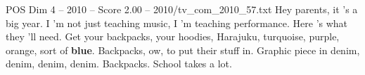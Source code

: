 \begin{textsample}{POS Dim 4 – 2010 – Score 2.00 – 2010/tv\_com\_2010\_57.txt}  \label{ex:f4_pos_051}
Hey parents, it 's a big year.
I 'm not just teaching music, I 'm teaching performance.
Here 's what they 'll need.
Get your backpacks, your hoodies, Harajuku, turquoise, purple, orange, sort of \textbf{blue}.
Backpacks, ow, to put their stuff in.
Graphic piece in denim, denim, denim, denim.
Backpacks.
School takes a lot.

\end{textsample}

